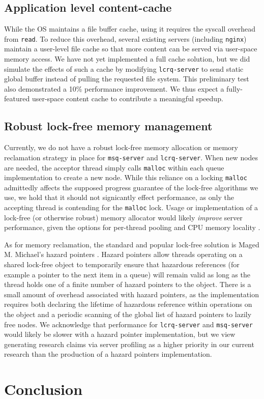 \documentclass[twoside,10pt]{article}
\begin{document}
\begin{multicols}{2}
\subsection{Application level content-cache}
While the OS maintains a file buffer cache, using it requires the
syscall overhead from \verb+read+. To reduce this overhead, several
existing servers (including \verb+nginx+) maintain a user-level file
cache so that more content can be served via user-space memory
access. We have not yet implemented a full cache solution, but we did
simulate the effects of such a cache by modifying \verb+lcrq-server+
to send static global buffer instead of pulling the requested file
system. This preliminary test also demonstrated a 10\% performance
improvement. We thus expect a fully-featured user-space content cache
to contribute a meaningful speedup.

\subsection{Robust lock-free memory management}

Currently, we do not have a robust lock-free memory allocation or
memory reclamation strategy in place for \verb+msq-server+ and
\verb+lcrq-server+. When new nodes are needed, the acceptor thread
simply calls \verb+malloc+ within each queue implementation to create
a new node. While this reliance on a locking \verb+malloc+ admittedly
affects the supposed progress guarantee of the lock-free algorithms we
use, we hold that it should not signicantly effect performance, as
only the accepting thread is contending for the \verb+malloc+
lock. Usage or implementation of a lock-free (or otherwise robust)
memory allocator would likely \emph{improve} server performance, given the
options for per-thread pooling and CPU memory locality
\cite{hart2007performance}.

As for memory reclamation, the standard and popular lock-free solution
is Maged M. Michael's hazard pointers \cite{michael2004hazard}. Hazard
pointers allow threads operating on a shared lock-free object to
temporarily ensure that hazardous references (for example a pointer to
the next item in a queue) will remain valid as long as the thread
holds one of a finite number of hazard pointers to the object. There
is a small amount of overhead associated with hazard pointers, as the
implementation requires both declaring the lifetime of hazardous
reference within operations on the object and a periodic scanning of
the global list of hazard pointers to lazily free nodes. We
acknowledge that performance for \verb+lcrq-server+ and
\verb+msq-server+ would likely be slower with a hazard pointer
implementation, but we view generating research claims via server
profiling as a higher priority in our current research than the
production of a hazard pointers implementation.

\section{Conclusion}


\end{multicols}

{\small
  
  
}
\end{document}
